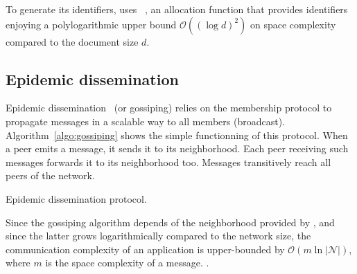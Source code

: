 To generate its identifiers, \CRATE uses \LSEQ~\cite{nedelec2013lseq}, an
allocation function that provides identifiers enjoying a polylogarithmic upper
bound $\mathcal{O}((\log d)^2)$ on space complexity compared to the document
size $d$.

\subsection{Epidemic dissemination}
\label{subsec:gossiping}

Epidemic dissemination~\cite{birman1999bimodal,demers1987epidemic} (or
gossiping) relies on the membership protocol to propagate messages in a scalable
way to all members (broadcast). Algorithm~\ref{algo:gossiping} shows the simple
functionning of this protocol. When a peer emits a message, it sends it to its
neighborhood. Each peer receiving such messages forwards it to its neighborhood
too. Messages transitively reach all peers of the network.

\begin{algorithm}[h]
  
  \caption{\label{algo:gossiping}Epidemic dissemination protocol.}
\end{algorithm}

Since the gossiping algorithm depends of the neighborhood provided by \SPRAY,
and since the latter grows logarithmically compared to the network size, the
communication complexity of an application is upper-bounded by
$\mathcal{O}(m \ln |\mathcal{N}|)$, where $m$ is the space complexity of a
message. .


